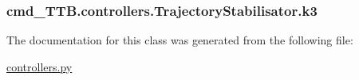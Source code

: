 \subsubsection[{\texorpdfstring{k3}{k3}}]{\setlength{\rightskip}{0pt plus 5cm}cmd\+\_\+\+T\+T\+B.\+controllers.\+Trajectory\+Stabilisator.\+k3}\hypertarget{classcmd__TTB_1_1controllers_1_1TrajectoryStabilisator_abe267c474aea918130fd31fdfe818938}{}\label{classcmd__TTB_1_1controllers_1_1TrajectoryStabilisator_abe267c474aea918130fd31fdfe818938}


The documentation for this class was generated from the following file\+:\begin{DoxyCompactItemize}
\item 
\hyperlink{controllers_8py}{controllers.\+py}\end{DoxyCompactItemize}

